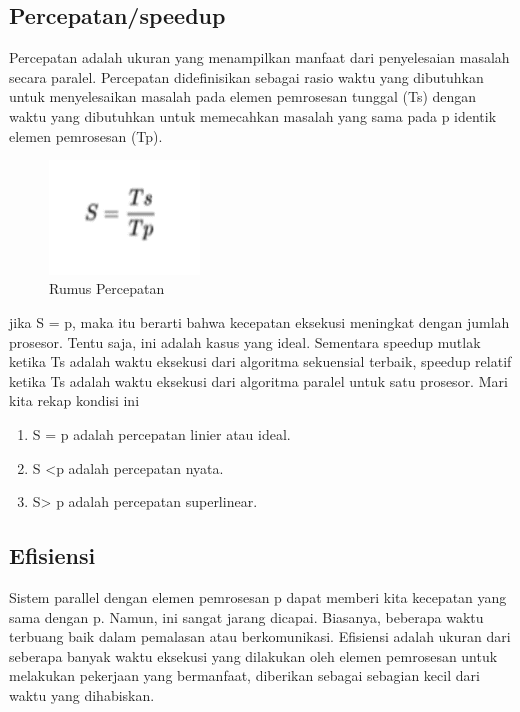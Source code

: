 \subsection{Percepatan/speedup}
Percepatan adalah ukuran yang menampilkan manfaat dari penyelesaian masalah secara paralel. Percepatan didefinisikan sebagai rasio waktu yang dibutuhkan untuk menyelesaikan masalah pada elemen pemrosesan tunggal (Ts) dengan waktu yang dibutuhkan untuk memecahkan masalah yang sama pada p identik elemen pemrosesan (Tp).
\begin{figure}[H]
    \includegraphics[width=4cm]{figures/kelompok3/1/speedup.png}
    \centering
    \caption{Rumus Percepatan}
\end{figure}
jika S = p, maka itu berarti bahwa kecepatan eksekusi meningkat dengan jumlah prosesor. Tentu saja, ini adalah kasus yang ideal. Sementara speedup mutlak ketika Ts adalah waktu eksekusi dari algoritma sekuensial terbaik, speedup relatif ketika Ts adalah waktu eksekusi dari algoritma paralel untuk satu prosesor. 
\hfill\break
Mari kita rekap kondisi ini
\begin{enumerate}
	\item S = p adalah percepatan linier atau ideal. 
	\item S <p adalah percepatan nyata. 
	\item S> p adalah percepatan superlinear.
\end{enumerate}

\subsection{Efisiensi}
Sistem parallel dengan elemen pemrosesan p dapat memberi kita kecepatan yang sama dengan p. Namun, ini sangat jarang dicapai. Biasanya, beberapa waktu terbuang baik dalam pemalasan atau berkomunikasi. 
\hfill\break
Efisiensi adalah ukuran dari seberapa banyak waktu eksekusi yang dilakukan oleh elemen pemrosesan untuk melakukan pekerjaan yang bermanfaat, diberikan sebagai sebagian kecil dari waktu yang dihabiskan.

